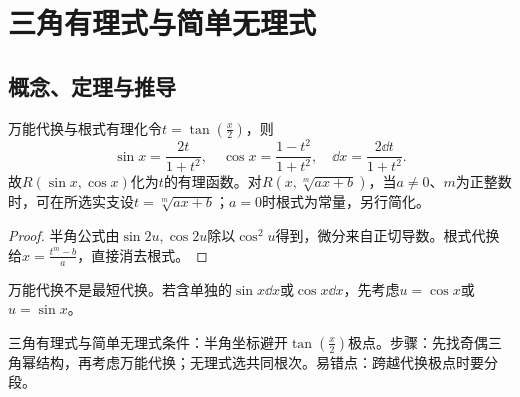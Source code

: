 \section{三角有理式与简单无理式}\label{sec:3:3}
\subsection{概念、定理与推导}

\begin{theorem}{万能代换与根式有理化}令$t=\tan(\frac{x}{2})$，则
\begin{equation}\sin x=\dfrac{2t}{1+t^2},\quad\cos x=\dfrac{1-t^2}{1+t^2},\quad\dd x=\dfrac{2\dd t}{1+t^2}.\end{equation}
故$R(\sin x,\cos x)$化为$t$的有理函数。对$R(x,\sqrt[m]{ax+b})$，当$a\ne0$、$m$为正整数时，可在所选实支设$t=\sqrt[m]{ax+b}$；$a=0$时根式为常量，另行简化。\end{theorem}
\begin{proof}半角公式由$\sin2u,\cos2u$除以$\cos^2u$得到，微分来自正切导数。根式代换给$x=\frac{t^m-b}{a}$，直接消去根式。\end{proof}
万能代换不是最短代换。若含单独的$\sin x\dd x$或$\cos x\dd x$，先考虑$u=\cos x$或$u=\sin x$。

\begin{method}{三角有理式与简单无理式}条件：半角坐标避开$\tan(\frac{x}{2})$极点。步骤：先找奇偶三角幂结构，再考虑万能代换；无理式选共同根次。易错点：跨越代换极点时要分段。\end{method}
